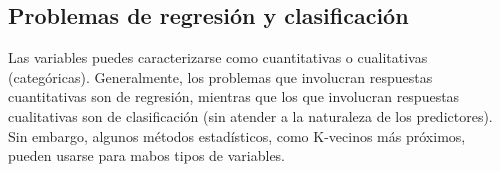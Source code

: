 \subsection{Problemas de regresión y clasificación}

Las variables puedes caracterizarse como cuantitativas o cualitativas (categóricas). Generalmente, los problemas que involucran respuestas cuantitativas son de regresión, mientras que los que involucran respuestas cualitativas son de clasificación (sin atender a la naturaleza de los predictores). Sin embargo, algunos métodos estadísticos, como K-vecinos más próximos, pueden usarse para mabos tipos de variables. 